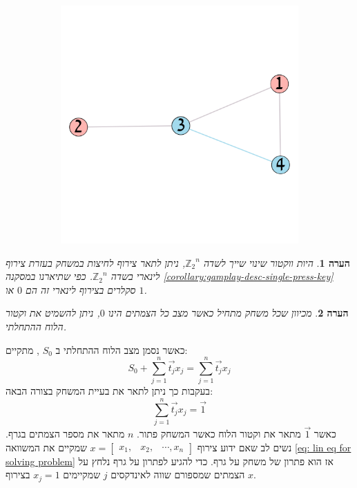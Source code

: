 \documentclass[12pt,leqno]{article}
\theoremstyle{theoremdd}
\newtheorem{comm}{הערה}[section]
\newcommand{\sumi}[1]{\sum_{#1=1}^n}
\newcommand{\Zn}{{\mathbb{Z}_2}^n}
\begin{document}
\begin{figure}[ht]
\begin{subfigure}[b]{.4\linewidth}
        \includegraphics[width=.7\textwidth,keepaspectratio]{images/graph_presses_solve.png}
    \end{subfigure}
\end{figure}

\begin{comm}
    היות ווקטור שינוי שייך לשדה
    $\Zn$,
    ניתן לתאר צירוף לחיצות במשחק 
    בעזרת צירוף לינארי 
    בשדה 
    $\Zn$.
    כפי שתיארנו במסקנה 
    \ref{corollary:gamplay-desc-single-press-key}
    סקלרים בצירוף לינארי זה הם
    $0$
    או 
    $1$.
\end{comm}
\begin{comm}
    מכיוון שכל משחק מתחיל 
    כאשר מצב כל הצמתים הינו 
    $0$,
    ניתן 
    להשמיט
    את וקטור הלוח 
    ההתחלתי.
\end{comm}

כאשר
נסמן מצב הלוח ההתחלתי 
ב
$S_0$
,
מתקיים:
\begin{equation}
    \label{eq: sum change vectors}
    S_0 + \sumi{j} \vec{t_j} x_j=  \sumi{j}  \vec{t_j}x_j
\end{equation}
בעקבות כך ניתן לתאר את בעיית המשחק בצורה הבאה:
\begin{equation}
    \label{eq: lin eq for solving problem}
    \sumi{j} \vec{t_j} x_j = \vec{1}
\end{equation}
כאשר
$\vec{1}$
מתאר 
את וקטור הלוח כאשר המשחק פתור.
$n$
מתאר
את
מספר הצמתים בגרף.
נשים לב 
שאם 
ידוע צירוף
$x = \begin{bmatrix}
    x_1, & x_2, & \cdots , x_n
\end{bmatrix}$
שמקיים את המשוואה 
\ref{eq: lin eq for solving problem}
אז הוא פתרון של משחק על גרף.
כדי להגיע לפתרון על גרף נלחץ על הצמתים שמספורם 
שווה 
לאינדקסים 
$j$
שמקיימים
$x_j = 1$
בצירוף 
$x$.
\end{document}
